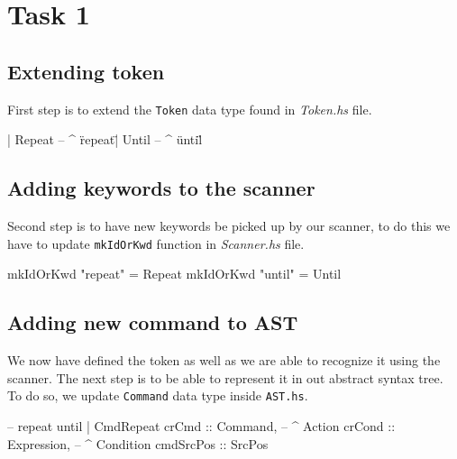 \documentclass{article}
\begin{document}
\tableofcontents

\newpage

\section{Task 1}

\subsection{Extending token}
\begin{flushleft}
First step is to extend the \texttt{Token} data type found in \textit{Token.hs} file.
\end{flushleft}
\begin{code}
| Repeat    -- ^ \"repeat\"
| Until     -- ^ \"until\"
\end{code}

\subsection{Adding keywords to the scanner}
\begin{flushleft}
Second step is to have new keywords be picked up by our scanner, to do this we have to update \texttt{mkIdOrKwd} function in \textit{Scanner.hs} file.
\end{flushleft}
\begin{code}
mkIdOrKwd "repeat" = Repeat
mkIdOrKwd "until" = Until
\end{code}

\subsection{Adding new command to AST}
\begin{flushleft}
We now have defined the token as well as we are able to recognize it using the scanner. The next step is to be able to represent it in out abstract syntax tree. To do so, we update \texttt{Command} data type inside \texttt{AST.hs}.
\end{flushleft}
\begin{code}
-- repeat until
| CmdRepeat {
      crCmd     :: Command,         -- ^ Action
      crCond    :: Expression,      -- ^ Condition
      cmdSrcPos :: SrcPos 
  }
\end{code}
\end{document}
